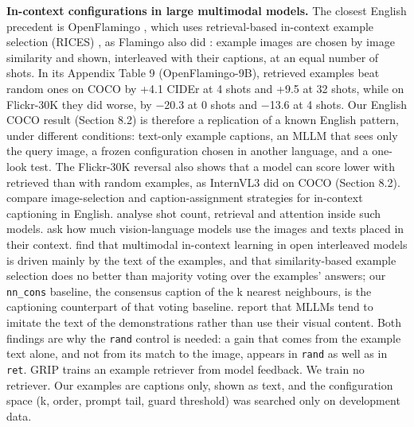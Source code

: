 \textbf{In-context configurations in large multimodal models.} The closest English precedent is
OpenFlamingo \citep{Awadalla2023OpenFlamingo}, which uses retrieval-based in-context example
selection (RICES) \citep{Yang2022PICa}, as Flamingo also did \citep{Alayrac2022Flamingo}: example
images are chosen by image similarity and shown, interleaved with their captions, at an equal number
of shots. In its Appendix Table 9 (OpenFlamingo-9B), retrieved examples beat random ones on COCO by
+4.1 CIDEr at 4 shots and +9.5 at 32 shots, while on Flickr-30K they did worse, by −20.3 at 0 shots
and −13.6 at 4 shots. Our English COCO result (Section 8.2) is therefore a replication of a known
English pattern, under different conditions: text-only example captions, an MLLM that sees only the
query image, a frozen configuration chosen in another language, and a one-look test. The Flickr-30K
reversal also shows that a model can score lower with retrieved than with random examples, as
InternVL3 did on COCO (Section 8.2). \citet{Yang2023ICLConfig} compare image-selection and
caption-assignment strategies for in-context captioning in English. \citet{Li2025UnveilingICL}
analyse shot count, retrieval and attention inside such models. \citet{dosSantos2025ContextVLM} ask
how much vision-language models use the images and texts placed in their context.
\citet{Baldassini2024MICL} find that multimodal in-context learning in open interleaved models is
driven mainly by the text of the examples, and that similarity-based example selection does no
better than majority voting over the examples' answers; our \texttt{nn\_cons} baseline, the
consensus caption of the k nearest neighbours, is the captioning counterpart of that voting
baseline. \citet{Chen2025TrueMICL} report that MLLMs tend to imitate the text of the demonstrations
rather than use their visual content. Both findings are why the \texttt{rand} control is needed: a
gain that comes from the example text alone, and not from its match to the image, appears in
\texttt{rand} as well as in \texttt{ret}. GRIP \citep{Allabadi2026GRIP} trains an example retriever
from model feedback. We train no retriever. Our examples are captions only, shown as text, and the
configuration space (k, order, prompt tail, guard threshold) was searched only on development data.

